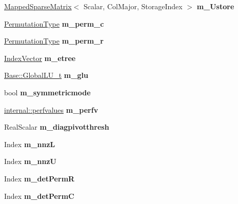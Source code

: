 \begin{DoxyCompactItemize}
\mbox{\hyperlink{class_eigen_1_1_mapped_sparse_matrix}{Mapped\+Sparse\+Matrix}}$<$ Scalar, Col\+Major, Storage\+Index $>$ {\bfseries m\+\_\+\+Ustore}
\item 
\mbox{\label{class_eigen_1_1_sparse_l_u_a17880d2a5075b0ad2be69e9a98b18d95}} 
\mbox{\hyperlink{class_eigen_1_1_permutation_matrix}{Permutation\+Type}} {\bfseries m\+\_\+perm\+\_\+c}
\item 
\mbox{\label{class_eigen_1_1_sparse_l_u_a1d0cd35485f50f819b65856f6989264a}} 
\mbox{\hyperlink{class_eigen_1_1_permutation_matrix}{Permutation\+Type}} {\bfseries m\+\_\+perm\+\_\+r}
\item 
\mbox{\label{class_eigen_1_1_sparse_l_u_a93bdda3c848baf65f906ad810bb67667}} 
\mbox{\hyperlink{class_eigen_1_1_matrix}{Index\+Vector}} {\bfseries m\+\_\+etree}
\item 
\mbox{\label{class_eigen_1_1_sparse_l_u_a6707db24747af79024d9dd86cbe92d32}} 
\mbox{\hyperlink{struct_eigen_1_1internal_1_1_l_u___global_l_u__t}{Base\+::\+Global\+L\+U\+\_\+t}} {\bfseries m\+\_\+glu}
\item 
\mbox{\label{class_eigen_1_1_sparse_l_u_abb21c4d4a3716038665e7525df123da9}} 
bool {\bfseries m\+\_\+symmetricmode}
\item 
\mbox{\label{class_eigen_1_1_sparse_l_u_a3f4b5dab545ba1f34b0d64d9a4f4fa59}} 
\mbox{\hyperlink{struct_eigen_1_1internal_1_1perfvalues}{internal\+::perfvalues}} {\bfseries m\+\_\+perfv}
\item 
\mbox{\label{class_eigen_1_1_sparse_l_u_aead99552b5213cee1fada904159c289a}} 
Real\+Scalar {\bfseries m\+\_\+diagpivotthresh}
\item 
\mbox{\label{class_eigen_1_1_sparse_l_u_a4fe45ce540c3f7f56b01a97eaaf35825}} 
Index {\bfseries m\+\_\+nnzL}
\item 
\mbox{\label{class_eigen_1_1_sparse_l_u_a60d8298823646bfa9b71d18a03cb83c2}} 
Index {\bfseries m\+\_\+nnzU}
\item 
\mbox{\label{class_eigen_1_1_sparse_l_u_a7cfd9bd6741f16a8c7a616c7e11bbe05}} 
Index {\bfseries m\+\_\+det\+PermR}
\item 
\mbox{\label{class_eigen_1_1_sparse_l_u_a13aa52a86648941a6c39b07c13d64093}} 
Index {\bfseries m\+\_\+det\+PermC}
\end{DoxyCompactItemize}


